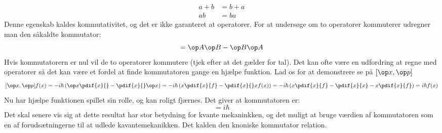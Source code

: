 \begin{align*}
a+b&=b+a\\
ab &= ba
\end{align*}
Denne egenskab kaldes kommutativitet, og det er ikke garanteret at operatorer. For at undersøge om to operatorer kommuterer udregner man den såkaldte kommutator:
\begin{equation}
[\op A,\op B] = \op A \op B-\op B \op A
\end{equation}
Hvis kommutatorern er nul vil de to operatorer kommutere (tjek efter at det gælder for tal). Det kan ofte være en udfordring at regne med operatorer så det kan være et fordel at finde kommutatoren gange en hjælpe funktion. Lad os for at demonstrere se på $[\op x,\op p]$
$$
[\op x,\op p] f(x) = -i\hbar\left(\op x\pdif{x}{}-\pdif{x}{}\op x\right) = -i \hbar \left(x\pdif{x}{f}-\pdif{x}{}xf(x)\right)=-i\hbar \left(x\pdif{x}{f}-\pdif{x}{x}-x\pdif{x}{f}\right) = i\hbar f(x)
$$
Nu har hjælpe funktionen spillet sin rolle, og kan roligt fjærnes. Det giver at kommutatoren er:
\begin{equation}
[\op x,\op p] = i\hbar
\label{kvant:eq:kankom}
\end{equation}
Det skal senere vis sig at dette resultat har stor betydning for kvante mekaninkken, og det muligt at bruge værdien af kommutatoren som en af forudsætningerne til at udlede kavantemekanikken.
Det kalden den knoniske kommutator relation.